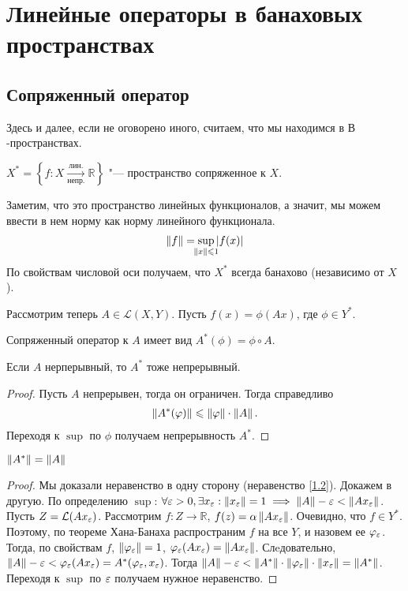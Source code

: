 \section{Линейные операторы в банаховых пространствах}
\subsection{Сопряженный оператор}

Здесь и далее, если не оговорено иного, считаем, что мы находимся в $В$-пространствах.

\begin{definition}
    $X^* = \left\{ f : X \xrightarrow[\text{непр.}]{\text{лин.}} \mathbb{R} \right\}$ "--- пространство сопряженное к $X$.
\end{definition}
Заметим, что это пространство линейных функционалов, а значит, мы можем ввести в нем норму как норму линейного функционала.
\begin{gather}
    \norm{f} = \sup_{\mathclap{\norm{x} \leqslant 1}} \abs{f(x)}  \\
\end{gather}
По свойствам числовой оси получаем, что $X^*$ всегда банахово (независимо от $X$).

Рассмотрим теперь $A \in \mathcal{L}(X, Y)$. Пусть $f(x) = \phi(Ax)$, где $\phi \in Y^*$.
\begin{definition}
    Сопряженный оператор к $A$ имеет вид $A^*(\phi) = \phi \circ A$.
\end{definition}
\begin{statement}
    Если $A$ нерперывный, то $A^*$ тоже непрерывный.
\end{statement}
\begin{proof}
    Пусть $A$ непрерывен, тогда он ограничен. Тогда справедливо
    \begin{gather}
        \left\|A^*(\varphi)\right\| \leqslant \left\|\varphi\right\| \cdot \left\|A\right\|\text{.} \label{1.2}
    \end{gather}
    Переходя к $\sup$ по $\phi$ получаем непрерывность $A^*$.
\end{proof}
\begin{theorem} \label{th1.2}
    $\left\|A^*\right\| = \left\|A\right\|$
\end{theorem}
\begin{proof}
    Мы доказали неравенство в одну сторону (неравенство \ref{1.2}). Докажем в другую.
    По определению $\sup$: $\forall \varepsilon > 0, \exists x_{\varepsilon} : \left\|x_{\varepsilon}\right\| = 1 \implies \left\|A\right\| - \varepsilon < \left\|Ax_{\varepsilon}\right\|$.
    Пусть $Z = \mathcal{L}(Ax_{\varepsilon})$. Рассмотрим $f : Z \rightarrow \mathbb{R}$, $f(z) = \alpha\left\|Ax_{\varepsilon}\right\|$.
    Очевидно, что $f \in Y^*$.
    Поэтому, по теореме Хана-Банаха распространим $f$ на все $Y$, и назовем ее $\varphi_{\varepsilon}$.
    Тогда, по свойствам $f$, $\left\|\varphi_{\varepsilon}\right\| = 1$, $\varphi_{\varepsilon}(Ax_{\varepsilon}) = \left\|Ax_{\varepsilon}\right\|$.
    Слeдовательно, $\left\|A\right\| - \varepsilon < \varphi_{\varepsilon}(Ax_{\varepsilon}) = A^*(\varphi_{\varepsilon}, x_{\varepsilon})$.
    Тогда $\left\|A\right\| - \varepsilon < \left\|A^*\right\| \cdot \left\|\varphi_{\varepsilon}\right\| \cdot \left\|x_{\varepsilon}\right\| = \left\|A^*\right\|$.
    Переходя к $\sup$ по $\varepsilon$ получаем нужное неравенство.
\end{proof}

